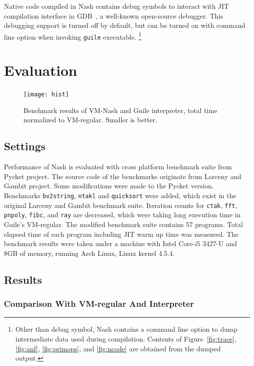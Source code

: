 \documentclass[preprint, 10pt]{sigplanconf}
\begin{document}
Native code compiled in Nash contains debug symbols to interact with JIT
compilation interface in GDB~\cite{stallman2002debugging}, a well-known
open-source debugger. This debugging support is turned off by default, but can
be turned on with command line option when invoking \texttt{guile} executable.
\footnote{Other than debug symbol, Nash contains a command line option to dump
  intermediate data used during compilation. Contents of
  Figure~\hyperref[fig:anf]{\ref{fig:trace}}, \hyperref[fig:anf]{\ref{fig:anf}},
  \hyperref[fig:primops]{\ref{fig:primops}}, and
  \hyperref[fig:ncode]{\ref{fig:ncode}} are obtained from the dumped output.}

\section{Evaluation}
\label{sec:evaluation}

\begin{figure}
  \centering
  \texttt{[image: hist]}
  \caption{Benchmark results of VM-Nash and Guile interpreter, total time
    normalized to VM-regular. Smaller is better.}
  \label{fig:bench}
\end{figure}

\subsection{Settings}

Performance of Nash is evaluated with cross platform benchmark suite from Pycket
project. The source code of the benchmarks originate from Larceny and Gambit
project. Some modifications were made to the Pycket version. Benchmarks
\texttt{bv2string}, \texttt{ntakl} and \texttt{quicksort} were added, which
exist in the original Larceny and Gambit benchmark suite. Iteration counts for
\texttt{ctak}, \texttt{fft}, \texttt{pnpoly}, \texttt{fibc}, and \texttt{ray}
are decreased, which were taking long execution time in Guile's VM-regular. The
modified benchmark suite contains 57 programs. Total elapsed time of each
program including JIT warm up time was measured. The benchmark results were
taken under a machine with Intel Core-i5 3427-U and 8GB of memory, running Arch
Linux, Linux kernel 4.5.4.

\subsection{Results}
\label{sec:results}

\subsubsection{Comparison With VM-regular And Interpreter}
\label{sec:guilecomp}
\end{document}
